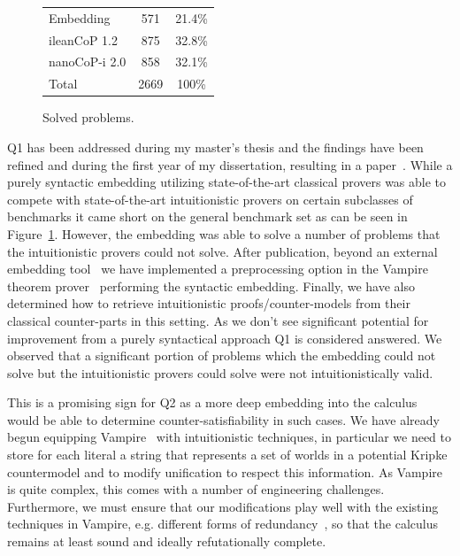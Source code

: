 \documentclass{article}
\theoremstyle{definition}
\theoremstyle{definition}
\theoremstyle{definition}
\theoremstyle{definition}
\theoremstyle{definition}
\theoremstyle{definition}
\theoremstyle{definition}
\newcommand{\0}{\mathbf 0}
\newcommand{\1}{\mathbf 1}
\begin{document}
	\begin{figure}
		\vspace*{-1cm}
		\begin{tabular}{l|c|c}
			Embedding&571&21.4\%\\
			ileanCoP 1.2&875&32.8\%\\
			nanoCoP-i 2.0&858&32.1\%\\\hline
			Total&2669&100\%
		\end{tabular}
		\caption{Solved problems.}
		\label{fig:a}
	\end{figure}

	Q1 has been addressed during my master's thesis and the findings have been refined and during the first year of my dissertation, resulting in a paper~\cite{pluska2023embedding}. While a purely syntactic embedding utilizing state-of-the-art classical provers was able to compete with state-of-the-art intuitionistic provers on certain subclasses of benchmarks it came short on the general benchmark set as can be seen in Figure~\ref{fig:a}. However, the embedding was able to solve a number of problems that the intuitionistic provers could not solve. After publication, beyond an external embedding tool~\cite{embedding} we have implemented a preprocessing option in the Vampire theorem prover~\cite{vampireintuitionistic} performing the syntactic embedding. Finally, we have also determined how to retrieve intuitionistic proofs/counter-models from their classical counter-parts in this setting. As we don't see significant potential for improvement from a purely syntactical approach Q1 is considered answered. We observed that a significant portion of problems which the embedding could not solve but the intuitionistic provers could solve were not intuitionistically valid.
	
	This is a promising sign for Q2 as a more deep embedding into the calculus would be able to determine counter-satisfiability in such cases. We have already begun equipping Vampire~\cite{kovacs2013first} with intuitionistic techniques, in particular we need to store for each literal a string that represents a set of worlds in a potential Kripke countermodel and to modify unification to respect this information. As Vampire is quite complex, this comes with a number of engineering challenges. Furthermore, we must ensure that our modifications play well with the existing techniques in Vampire, e.g. different forms of redundancy~\cite{gleiss2020subsumption}, so that the calculus remains at least sound and ideally refutationally complete.
\end{document}
